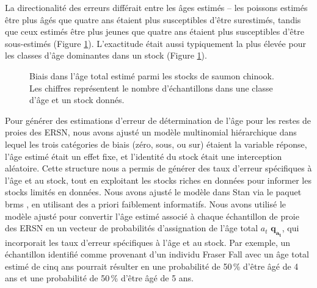 La directionalité des erreurs différait entre les âges estimés -- les poissons estimés être plus âgés que quatre ans étaient plus susceptibles d'être surestimés, tandis que ceux estimés être plus jeunes que quatre ans étaient plus susceptibles d'être sous-estimés (Figure \ref{fig:age-error-bar}). L'exactitude était aussi typiquement la plus élevée pour les classes d'âge dominantes dans un stock (Figure \ref{fig:age-error-bar}).

\begin{figure}[htb]
    \centering
    \caption{Biais dans l'âge total estimé parmi les stocks de saumon chinook. Les chiffres représentent le nombre d'échantillons dans une classe d'âge et un stock donnés.}
    \label{fig:age-error-bar}
\end{figure}

Pour générer des estimations d'erreur de détermination de l'âge pour les restes de proies des ERSN, nous avons ajusté un modèle multinomial hiérarchique dans lequel les trois catégories de biais (zéro, sous, ou sur) étaient la variable réponse, l'âge estimé était un effet fixe, et l'identité du stock était une interception aléatoire. Cette structure nous a permis de générer des taux d'erreur spécifiques à l'âge et au stock, tout en exploitant les stocks riches en données pour informer les stocks limités en données. Nous avons ajusté le modèle dans Stan via le paquet brms \citep{burknerBrmsPackageBayesian2017}, en utilisant des a priori faiblement informatifs. Nous avons utilisé le modèle ajusté pour convertir l'âge estimé associé à chaque échantillon de proie des ERSN en un vecteur de probabilités d'assignation de l'âge total $a_t$ $\boldsymbol{q_{a_t}}$, qui incorporait les taux d'erreur spécifiques à l'âge et au stock. Par exemple, un échantillon identifié comme provenant d'un individu Fraser Fall avec un âge total estimé de cinq ans pourrait résulter en une probabilité de 50\,\% d'être âgé de 4 ans et une probabilité de 50\,\% d'être âgé de 5 ans. 

